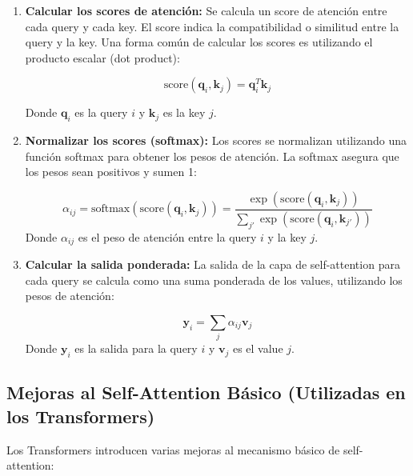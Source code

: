 \documentclass{article}
\begin{document}
\begin{enumerate}
    \item \textbf{Calcular los scores de atención:}  Se calcula un score de atención entre cada query y cada key.  El score indica la compatibilidad o similitud entre la query y la key.  Una forma común de calcular los scores es utilizando el producto escalar (dot product):

    \[
    \text{score}(\mathbf{q}_i, \mathbf{k}_j) = \mathbf{q}_i^T \mathbf{k}_j
    \]

    Donde \(\mathbf{q}_i\) es la query \(i\) y \(\mathbf{k}_j\) es la key \(j\).
    \item \textbf{Normalizar los scores (softmax):}  Los scores se normalizan utilizando una función softmax para obtener los pesos de atención.  La softmax asegura que los pesos sean positivos y sumen 1:

    \[
    \alpha_{ij} = \text{softmax}(\text{score}(\mathbf{q}_i, \mathbf{k}_j)) = \frac{\exp(\text{score}(\mathbf{q}_i, \mathbf{k}_j))}{\sum_{j'} \exp(\text{score}(\mathbf{q}_i, \mathbf{k}_{j'}))}
    \]
    Donde \(\alpha_{ij}\) es el peso de atención entre la query \(i\) y la key \(j\).
    \item \textbf{Calcular la salida ponderada:}  La salida de la capa de self-attention para cada query se calcula como una suma ponderada de los values, utilizando los pesos de atención:

    \[
    \mathbf{y}_i = \sum_j \alpha_{ij} \mathbf{v}_j
    \]
     Donde \(\mathbf{y}_i\) es la salida para la query \(i\) y \(\mathbf{v}_j\) es el value \(j\).
\end{enumerate}

\subsection{Mejoras al Self-Attention Básico (Utilizadas en los Transformers)}

Los Transformers introducen varias mejoras al mecanismo básico de self-attention:
\end{document}
